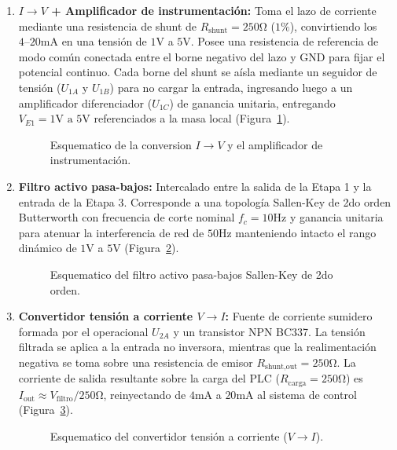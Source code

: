 \begin{enumerate}
    \item \textbf{$I \to V$ + Amplificador de instrumentación:} Toma el lazo de corriente mediante una resistencia de
        shunt de $R_{\text{shunt}} = 250 \unit{\ohm}$ ($1\%$), convirtiendo los $4\text{--}20 \unit{\milli\ampere}$ en
        una tensión de $1 \unit{\volt}$ a $5 \unit{\volt}$. Posee una resistencia de referencia de modo común conectada
        entre el borne negativo del lazo y GND para fijar el potencial continuo. Cada borne del shunt se aísla mediante
        un seguidor de tensión ($U_{1A}$ y $U_{1B}$) para no cargar la entrada, ingresando luego a un amplificador
        diferenciador ($U_{1C}$) de ganancia unitaria, entregando $V_{E1} = 1 \unit{\volt} \text{ a } 5 \unit{\volt}$
        referenciados a la masa local (Figura~\ref{fig.ej1:sch_etapa1}).  \begin{figure}[!ht]
            \centering
            
            \caption{Esquematico de la conversion $I \to V$ y el amplificador de instrumentación.}
            \label{fig.ej1:sch_etapa1}
        \end{figure}

    \item \textbf{Filtro activo pasa-bajos:} Intercalado entre la salida de la Etapa 1 y la entrada de la Etapa 3.
        Corresponde a una topología Sallen-Key de 2do orden Butterworth con frecuencia de corte nominal $f_c = 10
        \unit{\hertz}$ y ganancia unitaria para atenuar la interferencia de red de $50 \unit{\hertz}$
        manteniendo intacto el rango dinámico de $1 \unit{\volt}$ a $5 \unit{\volt}$ (Figura~\ref{fig.ej1:sch_etapa2}).
        \begin{figure}[!ht]
            \centering
            
            \caption{Esquematico del filtro activo pasa-bajos Sallen-Key de 2do orden.}
            \label{fig.ej1:sch_etapa2}
        \end{figure}

    \item \textbf{Convertidor tensión a corriente $V \to I$:} Fuente de corriente sumidero formada por el operacional
        $U_{2A}$ y un transistor NPN BC337. La tensión filtrada se aplica a la entrada no inversora, mientras que la
        realimentación negativa se toma sobre una resistencia de emisor $R_{\text{shunt,out}} = 250 \unit{\ohm}$.  La
        corriente de salida resultante sobre la carga del PLC ($R_{\text{carga}} = 250 \unit{\ohm}$) es $I_{\text{out}}
        \approx V_{\text{filtro}} / 250 \unit{\ohm}$, reinyectando de $4 \unit{\milli\ampere}$ a $20
        \unit{\milli\ampere}$ al sistema de control (Figura~\ref{fig.ej1:sch_etapa3}).
        \begin{figure}[!ht]
            \centering
            
            \caption{Esquematico del convertidor tensión a corriente ($V \to I$).}
            \label{fig.ej1:sch_etapa3}
        \end{figure}
\end{enumerate}

